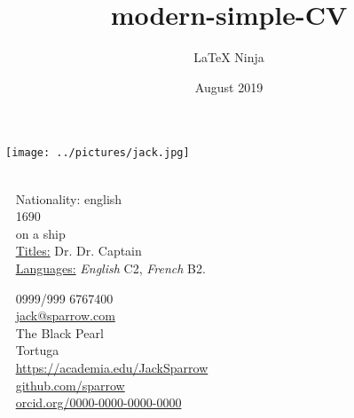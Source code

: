 \documentclass{modernsimplecv}
\title{modern-simple-CV}
\author{\LaTeX{} Ninja}
\date{August 2019}
\begin{document}
\thispagestyle{empty}




\begin{minipage}[t]{0.21\textwidth}
\vspace{0pt} %
\texttt{[image: ../pictures/jack.jpg]}\hspace{1em}
\end{minipage}
\hfill
\begin{minipage}[t]{0.77\textwidth}
\vspace{0pt} %
\begin{shaded*}

\begin{minipage}[t]{0.4\textwidth}
\vspace{0pt} %
{\par\centering\huge{}} \\[0.3cm]
\faGlobe~ Nationality: english\\
\faBirthdayCake~ 1690 \\
\faMapMarker~ on a ship \\

{\small
\faGraduationCap~ \underline{Titles:} Dr. Dr. Captain \\
\faCommentsO~ \underline{Languages:} \emph{English} C2, \emph{French} B2.}
\end{minipage}\hfill
\begin{minipage}[t]{0.55\textwidth}
\vspace{0pt} %
\faPhone~ 0999/999 6767400 \\
\faAt~ \protect\url{jack@sparrow.com} \\

\faEnvelopeO~ The Black Pearl \\
\faMapMarker~ Tortuga \\

\faFont~ \protect\url{https://academia.edu/JackSparrow} \\
\faGithub~ \protect\url{github.com/sparrow} \\
\faCircle~ \protect\url{orcid.org/0000-0000-0000-0000} \\
\end{minipage}
\hfill
\end{shaded*}
\end{minipage}\\[15pt]
\end{document}
